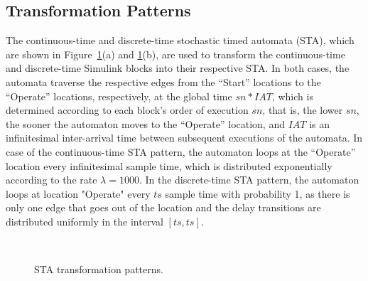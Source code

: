 \subsection*{Transformation Patterns} 
The continuous-time and discrete-time stochastic timed automata (STA), which are shown in Figure~\ref{fig_patterns}(a) and \ref{fig_patterns}(b), are used to transform the continuous-time and discrete-time Simulink blocks into their respective STA. In both cases, the automata traverse the respective edges from the ``Start'' locations to the ``Operate'' locations, respectively, at the global time $sn*IAT$, which is determined according to each block's order of execution $sn$, that is, the lower $sn$, the sooner the automaton moves to the ``Operate'' location, and $IAT$ is an infinitesimal inter-arrival time between subsequent executions of the automata. In case of the continuous-time STA pattern, the automaton loops at the ``Operate'' location every infinitesimal sample time, which is distributed exponentially according to the rate  $\lambda=1000$. In the discrete-time STA pattern, the automaton loops at location "Operate" every $ts$ sample time with probability 1, as there is only one edge that goes out of the location and the delay transitions are distributed uniformly in the interval $[ts,ts]$.
\begin{figure}[h] 
	\centering
	 ~
	\caption{STA transformation patterns.} 
	\label{fig_patterns}
\end{figure}

